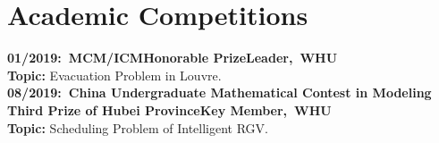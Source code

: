 \documentclass[a4paper]{article}
\begin{document}
\section{Academic Competitions}
\textbf{01/2019:\ MCM/ICM\hspace{2cm}Honorable Prize\hspace{2cm}Leader,\ WHU\\}
\textbf{Topic:} Evacuation Problem in Louvre.\\

\textbf{08/2019:\ China Undergraduate Mathematical Contest in Modeling\\Third Prize of Hubei Province\hspace{2cm}Key Member,\ WHU\\}
\textbf{Topic:}  Scheduling Problem of Intelligent RGV.

\end{document}
